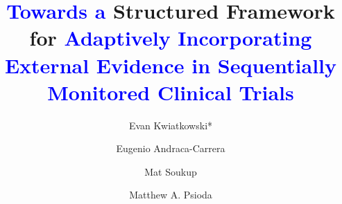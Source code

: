 \documentclass[AMA,STIX1COL,doublespace]{WileyNJD-v2}
\begin{document}
\title{\textcolor{blue}{Towards a} Structured Framework for \textcolor{blue}{Adaptively Incorporating External Evidence in Sequentially Monitored Clinical Trials}}

\author[1]{Evan Kwiatkowski*}

\author[2]{Eugenio Andraca-Carrera}

\author[2]{Mat Soukup}

\author[1]{Matthew A. Psioda}



\address[1]{, , }

\address[2]{Division of Biometrics VII, Office of Biostatistics, Center for Drug Evaluation and Research, US Food and Drug Administration, Silver Spring, Maryland, USA}




\end{document}
